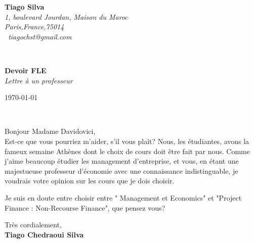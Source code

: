 \documentclass[11pt]{article}
\begin{document}
\hfill%
\begin{minipage}[t]{.6\textwidth}
\raggedleft%
{\bfseries Tiago Silva}\\[.35ex]
\small\itshape%
1, boulevard Jourdan, Maison du Maroc\\
Paris,France,75014\\[.35ex]
\Letter~tiagochst@gmail.com
\end{minipage}\\[1em]
%
\begin{minipage}[t]{.4\textwidth}
\raggedright%
{\bfseries Devoir FLE}\\[.35ex]
\small\itshape%
Lettre à un professeur\\
\end{minipage}
\hfill %
\begin{minipage}[t]{.4\textwidth}
\raggedleft %
\today
\end{minipage}\\[2em]
\raggedright


%




%



Bonjour Madame Davidovici,\\[1.5em]

Est-ce que vous pourriez m'aider, s'il vous plaît?
Nous, les étudiantes, avons la fameux semaine Athènes dont le choix de cours doit être fait par nous. Comme j'aime beaucoup étudier les management d’entreprise, et vous, en étant une majestueuse professeur d'économie avec une connaissance indistinguable, je voudrais votre opinion sur les cours que je dois choisir.

Je suis en doute entre choisir entre " Management et Economics" et "Project Finance : Non-Recourse Finance", que pensez vous?

Très cordialement,\\[2em] %
%
{\bfseries Tiago Chedraoui Silva}\\
%
\vfill%
\end{document}
